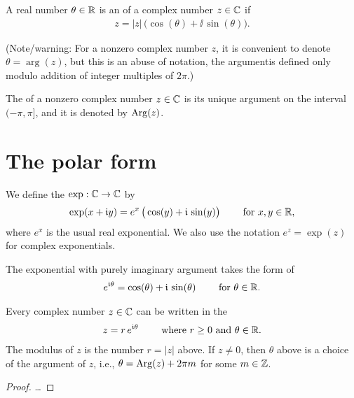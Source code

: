\begin{definition}
  \label{def:argument}
  A real number $\theta \in \mathbb{R}$ is an  of a complex
  number $z \in \mathbb{C}$ if
  \begin{align*}
    z = |z| \, \Big( \cos (\theta) + \ii \, \sin (\theta) \Big) .
  \end{align*}

  (Note/warning: For a nonzero complex number $z$,
  it is convenient to denote $\theta = \arg(z)$,
  but this is an abuse of notation, the argumentis defined only
  modulo addition of integer multiples of $2 \pi$.)

  The  of a nonzero complex number $z \in \mathbb{C}$
  is its unique argument on the interval $(-\pi, \pi]$, and it is denoted
  by $\mathrm{Arg}(z)$.
\end{definition}



\section{The polar form}

\begin{definition}
  \label{def:complex_exp}
  We define the  $\exp : \mathbb{C} \to \mathbb{C}$ by
  \begin{align*}
    \exp(x + \mathfrak{i} y) = e^x \, \big( \cos(y) + \mathfrak{i} \, \sin(y) \big)
    \qquad \text{ for } x,y \in \mathbb{R} ,
  \end{align*}
  where $e^x$ is the usual real exponential.
  We also use the notation $e^z = \exp(z)$ for complex exponentials.

  The exponential with purely imaginary argument takes the
  form of 
  \begin{align*}
    e^{\mathfrak{i} \theta} = \cos(\theta) + \mathfrak{i} \, \sin(\theta)
    \qquad \text{ for } \theta \in \mathbb{R} .
  \end{align*}
\end{definition}

\begin{lemma}
  \label{lem:polar_form}
  Every complex number $z \in \mathbb{C}$ can be written in the 
  \begin{align*}
    z = r \, e^{\mathfrak{i} \theta}
    \qquad \text{ where $r \ge 0$ and $\theta \in \mathbb{R}$.}
  \end{align*}
  The modulus of $z$ is the number $r = |z|$ above.
  If $z \ne 0$, then $\theta$ above is a choice of the argument of $z$,
  i.e., $\theta = \mathrm{Arg}(z) + 2 \pi m$ for some $m \in \mathbb{Z}$.
\end{lemma}
\begin{proof}
  \ldots
\end{proof}

